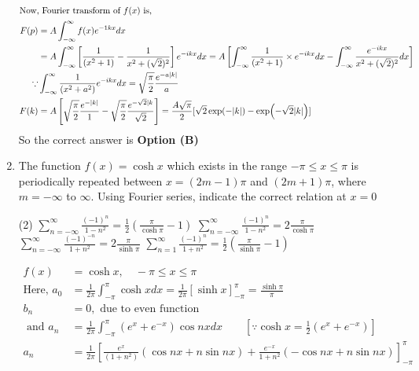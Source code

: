 \begin{enumerate}[label=\color{ocre}\textbf{\arabic*.}]
\begin{answer}
\begin{align*}
		\intertext{Now, Fourier transform of $f(x)$ is,}
		F(p)&=A \int_{-\infty}^{\infty} f(x) e^{-1 k x} d x\\
		&=A \int_{-\infty}^{\infty}\left[\frac{1}{\left(x^{2}+1\right)}-\frac{1}{x^{2}+(\sqrt{2})^{2}}\right] e^{-i k x} d x=A\left[\int_{-\infty}^{\infty} \frac{1}{\left(x^{2}+1\right)} \times e^{-i k x} d x-\int_{-\infty}^{\infty} \frac{e^{-i k x}}{x^{2}+(\sqrt{2})^{2}} d x\right]\\
		\because &\int_{-\infty}^{\infty} \frac{1}{\left(x^{2}+a^{2}\right)} e^{-i k x} d x=\sqrt{\frac{\pi}{2}} \frac{e^{-a|k|}}{a}\\
		F(k)&=A\left[\sqrt{\frac{\pi}{2}} \frac{e^{-|k|}}{1}-\sqrt{\frac{\pi}{2}} \frac{e^{-\sqrt{2} \mid k}}{\sqrt{2}}\right]=\frac{A \sqrt{\pi}}{2}[\sqrt{2} \exp (-|k|)-\exp (-\sqrt{2}|k|)]\\
		\end{align*}
		So the correct answer is \textbf{Option (B)}
	\end{answer}
	\item The function $f(x)=\cosh x$ which exists in the range $-\pi \leq x \leq \pi$ is periodically repeated between $x=(2 m-1) \pi$ and $(2 m+1) \pi$, where $m=-\infty$ to $\infty$. Using Fourier series, indicate the correct relation at $x=0$
	{}
	\begin{tasks}(2)
		\task[\textbf{A.}] $\sum_{n=-\infty}^{\infty} \frac{(-1)^{n}}{1-n^{2}}=\frac{1}{2}\left(\frac{\pi}{\cosh \pi}-1\right)$
		\task[\textbf{B.}]$\sum_{n=-\infty}^{\infty} \frac{(-1)^{n}}{1-n^{2}}=2 \frac{\pi}{\cosh \pi}$
		\task[\textbf{C.}]$\sum_{n=-\infty}^{\infty} \frac{(-1)^{-n}}{1+n^{2}}=2 \frac{\pi}{\sinh \pi}$
		\task[\textbf{D.}] $\sum_{n=1}^{\infty} \frac{(-1)^{n}}{1+n^{2}}=\frac{1}{2}\left(\frac{\pi}{\sinh \pi}-1\right)$
	\end{tasks}
	\begin{answer}
		\begin{align*}
		f(x)&=\cosh x, \quad-\pi \leq x \leq \pi\\
		\text{Here, }a_{0}&=\frac{1}{2 \pi} \int_{-\pi}^{\pi} \cosh x d x=\frac{1}{2 \pi}[\sinh x]_{-\pi}^{\pi}=\frac{\sinh \pi}{\pi}\\
		b_{n}&=0,\text{ due to even function}\\
		\text{	and }a_{n}&=\frac{1}{2 \pi} \int_{-\pi}^{\pi}\left(e^{x}+e^{-x}\right) \cos n x d x\qquad
		\left[\because \cosh x=\frac{1}{2}\left(e^{x}+e^{-x}\right)\right]\\
		a_{n}&=\frac{1}{2 \pi}\left[\frac{e^{x}}{\left(1+n^{2}\right)}(\cos n x+n \sin n x)+\frac{e^{-x}}{1+n^{2}}(-\cos n x+n \sin n x)\right]_{-\pi}^{\pi}\\

\end{align*}
\end{answer}
\end{enumerate}
